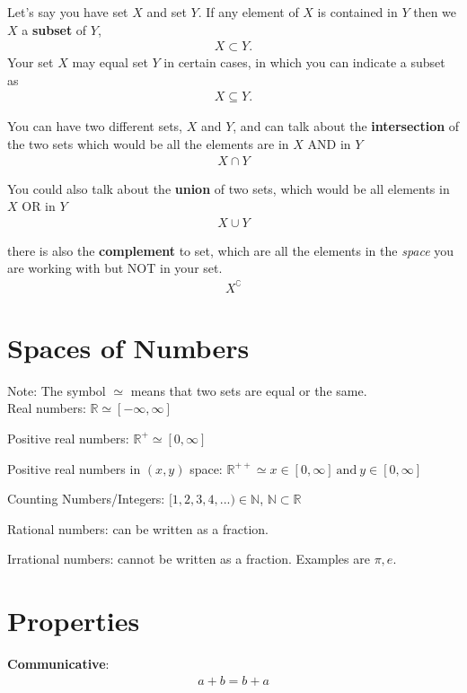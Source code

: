 \documentclass[12pt]{article}
\begin{document}
Let's say you have set $X$ and set $Y$. If any element of $X$ is contained in $Y$ then we $X$ a \textbf{subset} of $Y$, 
\begin{align*}
    X \subset Y.
\end{align*}
Your set $X$ may equal set $Y$ in certain cases, in which you can indicate a subset as 
\begin{align}
    X \subseteq Y.
\end{align}

You can have two different sets, $X$ and $Y$, and can talk about the \textbf{intersection} of the two sets which would be all the elements are in $X$ AND in $Y$ 
\begin{align*}
    X \cap Y
\end{align*}

You could also talk about the \textbf{union} of two sets, which would be all elements in $X$ OR in $Y$
\begin{align*}
    X \cup Y
\end{align*}

there is also the \textbf{complement} to set, which are all the elements in the \textit{space} you are working with but NOT in your set. 
\begin{align*}
    X^\complement
\end{align*}

\section{Spaces of Numbers}

Note: The symbol $\simeq$ means that two sets are equal or the same. \\

Real numbers: $\mathbb{R} \simeq [- \infty, \infty]$

Positive real numbers: $\mathbb{R}^+ \simeq [0, \infty]$

Positive real numbers in $(x,y)$ space: $\mathbb{R}^{++} \simeq  x \in [0, \infty]\ \text{and}\ y \in [0, \infty]$

Counting Numbers/Integers: $[1,2,3,4,...) \in \mathbb{N}$, $\mathbb{N} \subset \mathbb{R}$ 

Rational numbers: can be written as a fraction. 

Irrational numbers: cannot be written as a fraction. Examples are $\pi, e$.

\section{Properties}
\textbf{Communicative}:
\begin{align*}
    a+b = b+ a
\end{align*}
\end{document}
